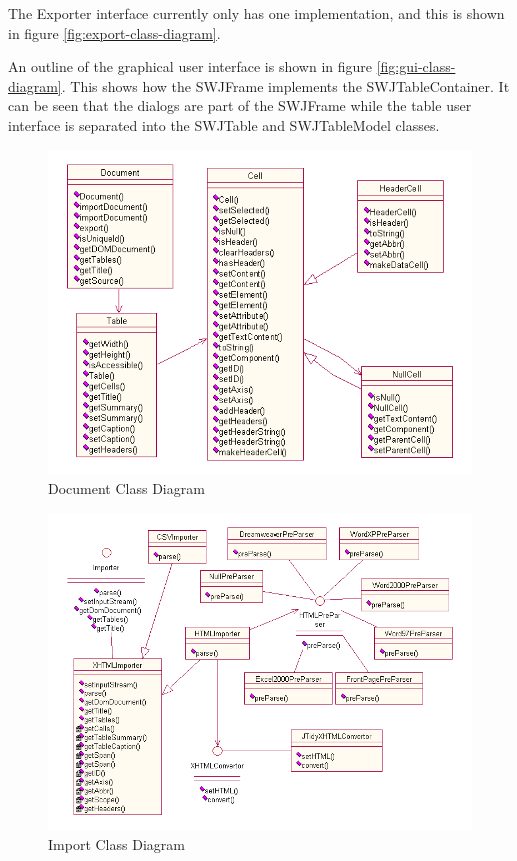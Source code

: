 The Exporter interface currently only has one implementation, and this
is shown in figure \ref{fig:export-class-diagram}.

An outline of the graphical user interface is shown in figure
\ref{fig:gui-class-diagram}. This shows how the SWJFrame implements
the SWJTableContainer. It can be seen that the dialogs are part of
the SWJFrame while the table user interface is separated into
the SWJTable and SWJTableModel classes.

\begin{figure}
\includegraphics[width=150mm]{figures/document-class-diagram.png}
\caption{Document Class Diagram}
\label{fig:document-class-diagram}
\end{figure}

\begin{figure}
\includegraphics[width=150mm]{figures/import-class-diagram.png}
\caption{Import Class Diagram}
\label{fig:import-class-diagram}
\end{figure}

